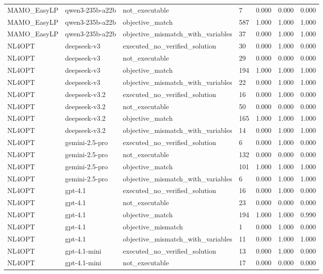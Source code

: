 \begin{table}[t]
\begin{tabular}{lllllll}
MAMO\_EasyLP & qwen3-235b-a22b & not\_executable & 7 & 0.000 & 0.000 & 0.000 \\
MAMO\_EasyLP & qwen3-235b-a22b & objective\_match & 587 & 1.000 & 1.000 & 1.000 \\
MAMO\_EasyLP & qwen3-235b-a22b & objective\_mismatch\_with\_variables & 37 & 0.000 & 1.000 & 1.000 \\
NL4OPT & deepseek-v3 & executed\_no\_verified\_solution & 30 & 0.000 & 1.000 & 0.000 \\
NL4OPT & deepseek-v3 & not\_executable & 29 & 0.000 & 0.000 & 0.000 \\
NL4OPT & deepseek-v3 & objective\_match & 194 & 1.000 & 1.000 & 1.000 \\
NL4OPT & deepseek-v3 & objective\_mismatch\_with\_variables & 22 & 0.000 & 1.000 & 1.000 \\
NL4OPT & deepseek-v3.2 & executed\_no\_verified\_solution & 16 & 0.000 & 1.000 & 0.000 \\
NL4OPT & deepseek-v3.2 & not\_executable & 50 & 0.000 & 0.000 & 0.000 \\
NL4OPT & deepseek-v3.2 & objective\_match & 165 & 1.000 & 1.000 & 1.000 \\
NL4OPT & deepseek-v3.2 & objective\_mismatch\_with\_variables & 14 & 0.000 & 1.000 & 1.000 \\
NL4OPT & gemini-2.5-pro & executed\_no\_verified\_solution & 6 & 0.000 & 1.000 & 0.000 \\
NL4OPT & gemini-2.5-pro & not\_executable & 132 & 0.000 & 0.000 & 0.000 \\
NL4OPT & gemini-2.5-pro & objective\_match & 101 & 1.000 & 1.000 & 1.000 \\
NL4OPT & gemini-2.5-pro & objective\_mismatch\_with\_variables & 6 & 0.000 & 1.000 & 1.000 \\
NL4OPT & gpt-4.1 & executed\_no\_verified\_solution & 16 & 0.000 & 1.000 & 0.000 \\
NL4OPT & gpt-4.1 & not\_executable & 23 & 0.000 & 0.000 & 0.000 \\
NL4OPT & gpt-4.1 & objective\_match & 194 & 1.000 & 1.000 & 0.990 \\
NL4OPT & gpt-4.1 & objective\_mismatch & 1 & 0.000 & 1.000 & 0.000 \\
NL4OPT & gpt-4.1 & objective\_mismatch\_with\_variables & 11 & 0.000 & 1.000 & 1.000 \\
NL4OPT & gpt-4.1-mini & executed\_no\_verified\_solution & 13 & 0.000 & 1.000 & 0.000 \\
NL4OPT & gpt-4.1-mini & not\_executable & 17 & 0.000 & 0.000 & 0.000 \\

\end{tabular}
\end{table}
